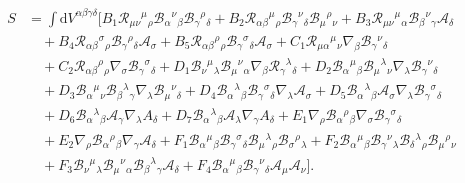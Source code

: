 \documentclass{article}
\begin{document}
\begin{equation}
    \label{PAG_action}
\begin{split}
S & =
    \int  \mathrm{d}V^{\alpha \beta \gamma \delta} \bigg[
    B_1 \mathcal{R}_{\mu\nu}{}^{\mu}{}_{\rho}\mathcal{B}_{\alpha}{}^{\nu}{}_{\beta}\mathcal{B}_{\gamma}{}^{\rho}{}_{\delta}
    + B_2 \mathcal{R}_{\alpha\beta}{}^{\mu}{}_{\rho} \mathcal{B}_{\gamma}{}^{\nu}{}_{\delta} \mathcal{B}_{\mu}{}^{\rho}{}_{\nu}
    + B_3 \mathcal{R}_{\mu\nu}{}^{\mu}{}_{\alpha} \mathcal{B}_{\beta}{}^{\nu}{}_{\gamma} \mathcal{A}_\delta
    \\
    & \quad
    + B_4 \mathcal{R}_{\alpha\beta}{}^{\sigma}{}_{\rho}\mathcal{B}_{\gamma}{}^{\rho}{}_{\delta}\mathcal{A}_\sigma
    + B_5 \mathcal{R}_{\alpha \beta}{}^{\rho}{}_{\rho} \mathcal{B}_{\gamma}{}^{\sigma}{}_{\delta} \mathcal{A}_\sigma
    + C_1 \mathcal{R}_{\mu\alpha}{}^{\mu}{}_{\nu} \nabla_\beta \mathcal{B}_{\gamma}{}^{\nu}{}_{\delta}
    \\
    & \quad
    + C_2 \mathcal{R}_{\alpha\beta}{}^{\rho}{}_{\rho} \nabla_\sigma \mathcal{B}_{\gamma}{}^{\sigma}{}_{\delta}
    + D_1 \mathcal{B}_{\nu}{}^{\mu}{}_{\lambda} \mathcal{B}_{\mu}{}^{\nu}{}_{\alpha} \nabla_\beta \mathcal{R}_{\gamma}{}^{\lambda}{}_{\delta}
    + D_2 \mathcal{B}_{\alpha}{}^{\mu}{}_{\beta} \mathcal{B}_{\mu}{}^{\lambda}{}_{\nu} \nabla_{\lambda} \mathcal{B}_{\gamma}{}^{\nu}{}_{\delta}
    \\
    & \quad
    + D_3 \mathcal{B}_{\alpha}{}^{\mu}{}_{\nu}\mathcal{B}_{\beta}{}^{\lambda}{}_{\gamma} \nabla_\lambda \mathcal{B}_{\mu}{}^{\nu}{}_{\delta}
    + D_4 \mathcal{B}_{\alpha}{}^{\lambda}{}_{\beta}\mathcal{B}_{\gamma}{}^{\sigma}{}_{\delta}\nabla_\lambda \mathcal{A}_\sigma
    + D_5 \mathcal{B}_{\alpha}{}^{\lambda}{}_{\beta} \mathcal{A}_\sigma \nabla_\lambda \mathcal{B}_{\gamma}{}^{\sigma}{}_{\delta}
    \\
    &\quad
    + D_6 \mathcal{B}_{\alpha}{}^{\lambda}{}_{\beta}\mathcal{A}_\gamma \nabla_\lambda A_\delta
    + D_7\mathcal{B}_{\alpha}{}^{\lambda}{}_{\beta} \mathcal{A}_\lambda \nabla_\gamma A_\delta
    + E_1\nabla_\rho \mathcal{B}_{\alpha}{}^{\rho}{}_{\beta} \nabla_\sigma \mathcal{B}_{\gamma}{}^{\sigma}{}_{\delta}
    \\
    &\quad
    + E_2 \nabla_\rho \mathcal{B}_{\alpha}{}^{\rho}{}_{\beta} \nabla_\gamma \mathcal{A}_\delta
    + F_1 \mathcal{B}_{\alpha}{}^{\mu}{}_{\beta} \mathcal{B}_{\gamma}{}^{\sigma}{}_{\delta} \mathcal{B}_{\mu}{}^{\lambda}{}_{\rho} \mathcal{B}_{\sigma}{}^{\rho}{}_{\lambda}
    + F_2\mathcal{B}_{\alpha}{}^{\mu}{}_{\beta} \mathcal{B}_{\gamma}{}^{\nu}{}_{\lambda} \mathcal{B}_{\delta}{}^{\lambda}{}_{\rho} \mathcal{B}_{\mu}{}^{\rho}{}_{\nu}
    \\
    &\quad
    + F_3 \mathcal{B}_{\nu}{}^{\mu}{}_{\lambda} \mathcal{B}_{\mu}{}^{\nu}{}_{\alpha} \mathcal{B}_{\beta}{}^{\lambda}{}_{\gamma} \mathcal{A}_\delta
    + F_4 \mathcal{B}_{\alpha}{}^{\mu}{}_{\beta}\mathcal{B}_{\gamma}{}^{\nu}{}_{\delta}\mathcal{A}_\mu \mathcal{A}_\nu \bigg].
\end{split}
\end{equation}
\end{document}
